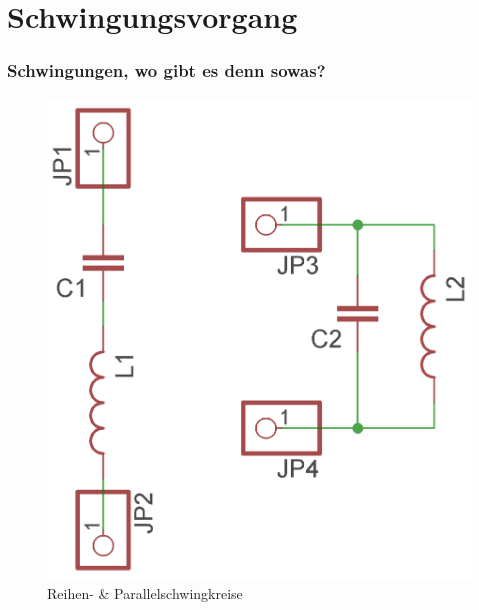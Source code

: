 

\subtitle{Technik Klasse E 07: \\
  Schwingkreise \& Filter \\[2em]}
\date{Stand 07.11.2016}


\section*{Schwingungs\-vorgang}

\begin{frame}
  \frametitle{Schwingungen, wo gibt es denn sowas?}
  \begin{center}
    \begin{figure}
      \includegraphics[width=\textwidth,height=.75\textheight,keepaspectratio]{e07/Schwingkreise.png}
      \caption{Reihen- \& Parallelschwingkreise}
    \end{figure}
  \end{center}
\end{frame}


